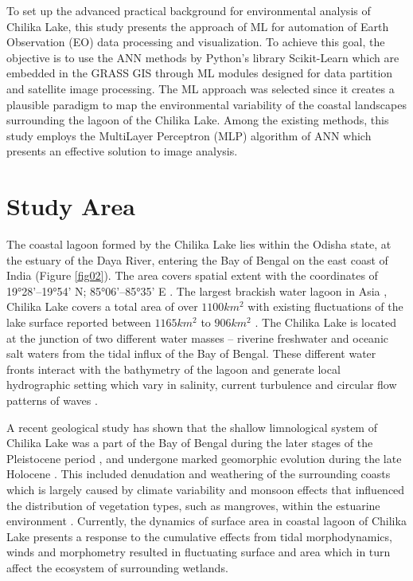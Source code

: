 \documentclass[jmse,article,submit,pdftex,moreauthors]{Definitions/mdpi}
\begin{document}
To set up the advanced practical background for environmental analysis of Chilika Lake, this study presents the approach of ML for automation of Earth Observation (EO) data processing and visualization. To achieve this goal, the objective is to use the ANN methods by Python's library Scikit-Learn \cite{scikitlearn} which are embedded in the GRASS GIS \cite{GRASS_GIS_software} through ML modules designed for data partition and satellite image processing. The ML approach was selected since it creates a plausible paradigm to map the environmental variability of the coastal landscapes surrounding the lagoon of the Chilika Lake. Among the existing methods, this study employs the MultiLayer Perceptron (MLP) algorithm of ANN which presents an effective solution to image analysis. 

\section{Study Area}
The coastal lagoon formed by the Chilika Lake lies within the Odisha state, at the estuary of the Daya River, entering the Bay of Bengal on the east coast of India (Figure \ref{fig02}). The area covers spatial extent with the coordinates of 19°28'--19°54' N; 85°06'--85°35' E \cite{PANDA201329}.  The largest brackish water lagoon in Asia \cite{BEHERA2020101328,BARIK201739}, Chilika Lake covers a total area of over $1100 km^2$ with existing fluctuations of the lake surface reported between $1165 km^2$ to $906 km^2$ \cite{Behera2023}. The Chilika Lake is located at the junction of two different water masses -- riverine freshwater and oceanic salt waters from the tidal influx of the Bay of Bengal. These different water fronts interact with the bathymetry of the lagoon and generate local hydrographic setting which vary in salinity, current turbulence and circular flow patterns of waves \cite{Nazneen}. 

A recent geological study has shown that the shallow limnological system of Chilika Lake was a part of the Bay of Bengal during the later stages of the Pleistocene period \cite{BOROLE1993761}, and undergone marked geomorphic evolution during the late Holocene \cite{MISHRA2022457,AMIR2021148}. This included denudation and weathering of the surrounding coasts which is largely caused by climate variability and monsoon effects that influenced the distribution of vegetation types, such as mangroves, within the estuarine environment \cite{DASH2023106754}. Currently, the dynamics of surface area in coastal lagoon of Chilika Lake presents a response to the cumulative effects from tidal morphodynamics, winds and morphometry resulted in fluctuating surface and area which in turn affect the ecosystem of surrounding wetlands.
\end{document}
